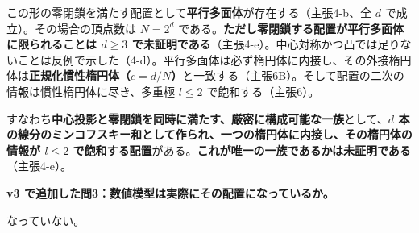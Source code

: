 \documentclass[
  10pt,
]{ltjsarticle}
\begin{document}
この形の零閉鎖を満たす配置として\textbf{平行多面体}が存在する（主張4-b、全
\(d\) で成立）。その場合の頂点数は \(N = 2^d\)
である。\textbf{ただし零閉鎖する配置が平行多面体に限られることは
\(d\ge3\)
で未証明である}（主張4-e）。中心対称かつ凸では足りないことは反例で示した（4-d）。平行多面体は必ず楕円体に内接し、その外接楕円体は\textbf{正規化慣性楕円体（\(c = d/N\)）}と一致する（主張6B）。そして配置の二次の情報は慣性楕円体に尽き、多重極
\(l\le2\) で飽和する（主張6）。

すなわち\textbf{中心投影と零閉鎖を同時に満たす、厳密に構成可能な一族}として、\textbf{\(d\)
本の線分のミンコフスキー和として作られ、一つの楕円体に内接し、その楕円体の情報が
\(l\le2\)
で飽和する配置}がある。\textbf{これが唯一の一族であるかは未証明である}（主張4-e）。

\textbf{v3 で追加した問3：数値模型は実際にその配置になっているか。}

なっていない。
\end{document}
